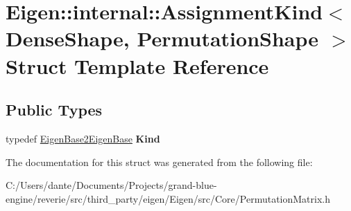\hypertarget{struct_eigen_1_1internal_1_1_assignment_kind_3_01_dense_shape_00_01_permutation_shape_01_4}{}\section{Eigen\+::internal\+::Assignment\+Kind$<$ Dense\+Shape, Permutation\+Shape $>$ Struct Template Reference}
\label{struct_eigen_1_1internal_1_1_assignment_kind_3_01_dense_shape_00_01_permutation_shape_01_4}
\subsection*{Public Types}
\begin{DoxyCompactItemize}
\item 
\mbox{\label{struct_eigen_1_1internal_1_1_assignment_kind_3_01_dense_shape_00_01_permutation_shape_01_4_a9c2e38eade45a93b83c5af22f5a2e7f5}} 
typedef \mbox{\hyperlink{struct_eigen_1_1internal_1_1_eigen_base2_eigen_base}{Eigen\+Base2\+Eigen\+Base}} {\bfseries Kind}
\end{DoxyCompactItemize}


The documentation for this struct was generated from the following file\+:\begin{DoxyCompactItemize}
\item 
C\+:/\+Users/dante/\+Documents/\+Projects/grand-\/blue-\/engine/reverie/src/third\+\_\+party/eigen/\+Eigen/src/\+Core/Permutation\+Matrix.\+h\end{DoxyCompactItemize}
